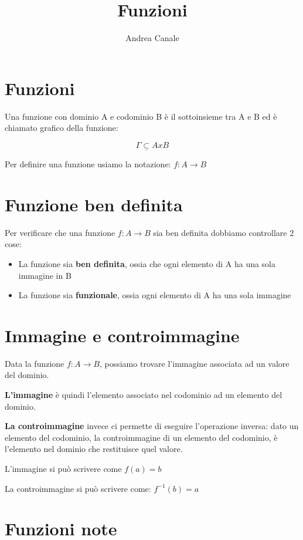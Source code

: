 \documentclass[a4paper, 10pt]{article}
\title{Funzioni}
\author{Andrea Canale}
\begin{document}
	
\maketitle
\begin{spacing}{2.3}
	\tableofcontents
\end{spacing}
\section{Funzioni}
Una funzione con dominio A e codominio B è il sottoinsieme tra A e B ed è chiamato grafico della funzione:

$$ \Gamma \underline{\subset} AxB $$

Per definire una funzione usiamo la notazione: $ f:A \rightarrow B $

\section{Funzione ben definita}

Per verificare che una funzione $ f:A \rightarrow B $ sia ben definita dobbiamo controllare 2 cose:

\begin{itemize}
	\item La funzione sia \textbf{ben definita}, ossia che ogni elemento di A ha una sola immagine in B
	\item La funzione sia \textbf{funzionale}, ossia ogni elemento di A ha una sola immagine
\end{itemize}

\section{Immagine e controimmagine}

Data la funzione $ f:A \rightarrow B $, possiamo trovare l'immagine associata ad un valore del dominio.

\textbf{L'immagine} è quindi l'elemento associato nel codominio ad un elemento del dominio.

\textbf{La controimmagine} invece ci permette di eseguire l'operazione inversa: dato un elemento del codominio, la controimmagine di un elemento del codominio, è l'elemento nel dominio che restituisce quel valore.

L'immagine si può scrivere come $ f(a) = b $

La controimmagine si può scrivere come: $ f^{-1}(b) = a $

\section{Funzioni note}
\end{document}

